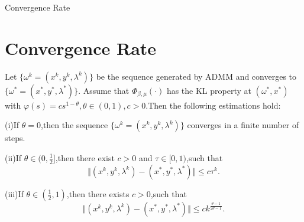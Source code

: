 \documentclass[10pt,cjk]{beamer}
\begin{document}
	\begin{frame}{Convergence Rate}
		\section{Convergence Rate}
		Let $\{\omega^{k}=\left(x^{k},y^{k},\lambda^{k}\right)\}$ be the sequence generated by ADMM and converges to $\{\omega^{*}=\left(x^{*},y^{*},\lambda^{*}\right)\}.$ Assume that $\Phi_{\beta,\mu}\left(\cdot\right)$ has the KL property at $\left(\omega^{*},x^{*}\right)$ with $\varphi\left(s\right)=cs^{1-\theta},\theta\in\left(0,1\right),c>0$.Then the following estimations hold:
		
		(i)If $\theta=0$,then the sequence $\{\omega^{k}=\left(x^{k},y^{k},\lambda^{k}\right)\}$ converges in a finite number of steps.
		
		(ii)If $\theta\in(0,\frac{1}{2}]$,then there exist $c>0$ and $\tau\in[0,1)$,such that
		$$\Vert\left(x^{k},y^{k},\lambda^{k}\right)-\left(x^{*},y^{*},\lambda^{*}\right)\Vert\le c\tau^{k}.$$
		
		(iii)If $\theta\in\left(\frac{1}{2},1\right)$,then there exists $c>0$,such that
		$$\Vert\left(x^{k},y^{k},\lambda^{k}\right)-\left(x^{*},y^{*},\lambda^{*}\right)\Vert\le ck^{\frac{\theta-1}{2\theta-1}}.$$
	\end{frame}
\end{document}
